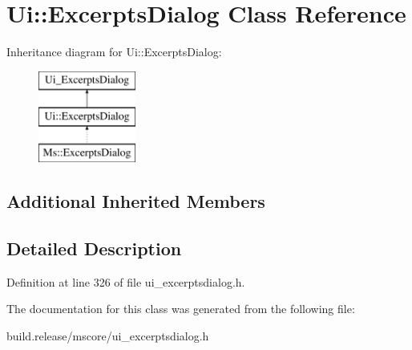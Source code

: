 \hypertarget{class_ui_1_1_excerpts_dialog}{}\section{Ui\+:\+:Excerpts\+Dialog Class Reference}
\label{class_ui_1_1_excerpts_dialog}
Inheritance diagram for Ui\+:\+:Excerpts\+Dialog\+:\begin{figure}[H]
\begin{center}
\leavevmode
\includegraphics[height=3.000000cm]{class_ui_1_1_excerpts_dialog}
\end{center}
\end{figure}
\subsection*{Additional Inherited Members}


\subsection{Detailed Description}


Definition at line 326 of file ui\+\_\+excerptsdialog.\+h.



The documentation for this class was generated from the following file\+:\begin{DoxyCompactItemize}
\item 
build.\+release/mscore/ui\+\_\+excerptsdialog.\+h\end{DoxyCompactItemize}
